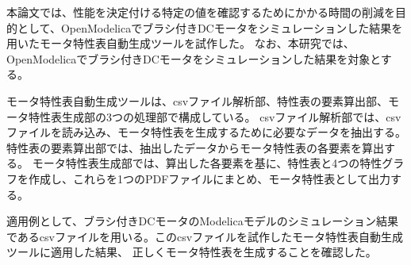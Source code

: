 





本論文では、性能を決定付ける特定の値を確認するためにかかる時間の削減を目的として、OpenModelicaでブラシ付きDCモータをシミュレーションした結果を用いたモータ特性表自動生成ツールを試作した。
なお、本研究では、OpenModelicaでブラシ付きDCモータ\cite{モータ使う}をシミュレーションした結果を対象とする。

モータ特性表自動生成ツールは、csvファイル解析部、特性表の要素算出部、モータ特性表生成部の3つの処理部で構成している。
csvファイル解析部では、csvファイルを読み込み、モータ特性表を生成するために必要なデータを抽出する。特性表の要素算出部では、抽出したデータからモータ特性表の各要素を算出する。
モータ特性表生成部では、算出した各要素を基に、特性表と4つの特性グラフを作成し、これらを1つのPDFファイルにまとめ、モータ特性表として出力する。

適用例として、ブラシ付きDCモータのModelicaモデルのシミュレーション結果であるcsvファイルを用いる。このcsvファイルを試作したモータ特性表自動生成ツールに適用した結果、
正しくモータ特性表を生成することを確認した。


